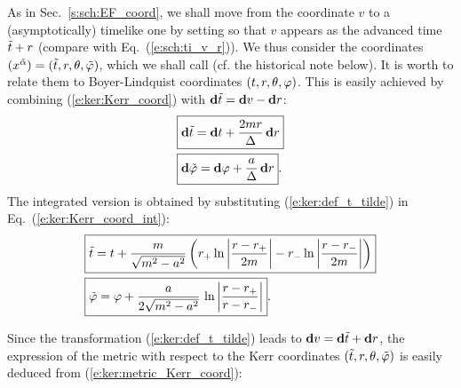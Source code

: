 As in Sec.~\ref{s:sch:EF_coord},
we shall move from the coordinate $v$ to a (asymptotically)
timelike one by setting
\be \label{e:ker:def_t_tilde}
     \iff {}
\ee
so that $v$ appears as the advanced time ${\tilde t}+r$ (compare with Eq.~(\ref{e:sch:ti_v_r})). We thus consider
the coordinates $(x^{\tilde{\alpha}}) = ({\tilde t}, r, \theta,{\tilde\varphi})$,
which we shall call
(cf. the historical note below).
It is worth to relate them to Boyer-Lindquist coordinates
$(t,r,\theta,\varphi)$. This is easily achieved
by combining (\ref{e:ker:Kerr_coord}) with $\mathbf{d}{\tilde t} = \mathbf{d} v - \mathbf{d} r$:
\begin{subequations}
\label{e:ker:Kerr_3p1_BL}
\begin{align}
& \fbox{$\displaystyle \mathbf{d} {\tilde t} = \mathbf{d} t + \frac{2m r}{\Delta} \, \mathbf{d} r$} \\
& \fbox{$\displaystyle \mathbf{d} {\tilde\varphi} = \mathbf{d} \varphi + \frac{a}{\Delta}\, \mathbf{d} r$} .
\end{align}
\end{subequations}
The integrated version is obtained by substituting (\ref{e:ker:def_t_tilde}) in
Eq.~(\ref{e:ker:Kerr_coord_int}):
\begin{subequations}
\label{e:ker:Kerr_3p1_BL_int}
\begin{align}
& \fbox{$\displaystyle {\tilde t} = t  + \frac{m}{\sqrt{m^2-a^2}} \left(
    r_+ \ln\left| \frac{r-r_+}{2m} \right|
    - r_- \ln\left| \frac{r-r_-}{2m} \right| \right) $} \label{e:ker:ti_t}\\
& \fbox{$\displaystyle  {\tilde\varphi} = \varphi + \frac{a}{2\sqrt{m^2-a^2}}\, \ln \left|
    \frac{r-r_+}{r-r_-} \right| $} .
\end{align}
\end{subequations}


Since the transformation (\ref{e:ker:def_t_tilde}) leads to $\mathbf{d} v = \mathbf{d}{\tilde t} + \mathbf{d} r$,
the expression of the metric with respect to the
Kerr coordinates $({\tilde t},r,\theta,{\tilde\varphi})$ is easily deduced from
(\ref{e:ker:metric_Kerr_coord}):
\be \label{e:ker:metric_Kerr_3p1}
\ee

